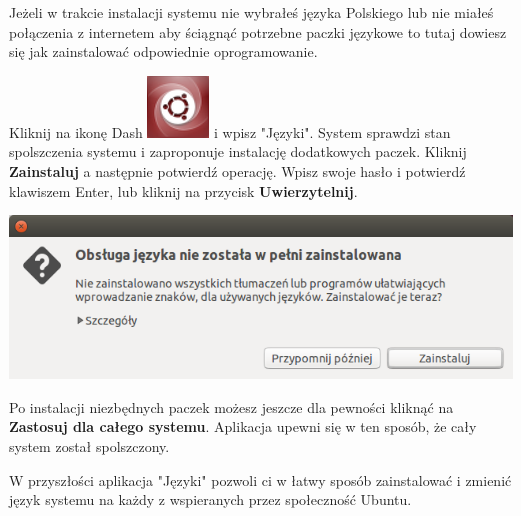 Jeżeli w trakcie instalacji systemu nie wybrałeś języka Polskiego lub nie miałeś połączenia z internetem aby ściągnąć potrzebne paczki językowe to tutaj dowiesz się jak zainstalować odpowiednie oprogramowanie.

Kliknij na ikonę Dash \includegraphics[scale=0.35]{images/ikony_dash.png} i wpisz "Języki". System sprawdzi stan spolszczenia systemu i zaproponuje instalację dodatkowych paczek. Kliknij \textbf{Zainstaluj} a następnie potwierdź operację. Wpisz swoje hasło i potwierdź klawiszem Enter, lub kliknij na przycisk \textbf{Uwierzytelnij}.

\begin{center}
	\includegraphics{images/pierwsze_uruchomienie_lang2.png}
\end{center}

Po instalacji niezbędnych paczek możesz jeszcze dla pewności kliknąć na \textbf{Zastosuj dla całego systemu}. Aplikacja upewni się w ten sposób, że cały system został spolszczony.

W przyszłości aplikacja "Języki" pozwoli ci w łatwy sposób zainstalować i zmienić język systemu na każdy z wspieranych przez społeczność Ubuntu.
\clearpage

